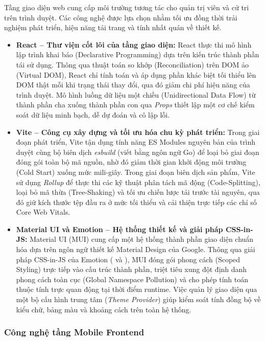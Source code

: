Tầng giao diện web cung cấp môi trường tương tác cho quản trị viên và cử tri trên trình duyệt. Các công nghệ được lựa chọn nhằm tối ưu đồng thời trải nghiệm phát triển, hiệu năng tải trang và tính nhất quán về thiết kế.

\begin{itemize}
    \item \textbf{React -- Thư viện cốt lõi của tầng giao diện:} React thực thi mô hình lập trình khai báo (Declarative Programming) dựa trên kiến trúc thành phần tái sử dụng. Thông qua thuật toán so khớp (Reconciliation) trên DOM ảo (Virtual DOM), React chỉ tính toán và áp dụng phần khác biệt tối thiểu lên DOM thật mỗi khi trạng thái thay đổi, qua đó giảm chi phí hiệu năng của trình duyệt. Mô hình luồng dữ liệu một chiều (Unidirectional Data Flow) từ thành phần cha xuống thành phần con qua \textit{Props} thiết lập một cơ chế kiểm soát dữ liệu minh bạch, dễ dự đoán và cô lập lỗi.

    \item \textbf{Vite -- Công cụ xây dựng và tối ưu hóa chu kỳ phát triển:} Trong giai đoạn phát triển, Vite tận dụng tính năng ES Modules nguyên bản của trình duyệt cùng bộ biên dịch \textit{esbuild} (viết bằng ngôn ngữ Go) để loại bỏ giai đoạn đóng gói toàn bộ mã nguồn, nhờ đó giảm thời gian khởi động môi trường (Cold Start) xuống mức mili-giây. Trong giai đoạn biên dịch sản phẩm, Vite sử dụng \textit{Rollup} để thực thi các kỹ thuật phân tách mã động (Code-Splitting), loại bỏ mã thừa (Tree-Shaking) và tối ưu chiến lược tải trước tài nguyên, qua đó giữ kích thước tệp đầu ra ở mức tối thiểu và cải thiện trực tiếp các chỉ số Core Web Vitals.

    \item \textbf{Material UI và Emotion -- Hệ thống thiết kế và giải pháp CSS-in-JS:} Material UI (MUI) cung cấp một hệ thống thành phần giao diện chuẩn hóa dựa trên ngôn ngữ thiết kế Material Design của Google. Thông qua giải pháp CSS-in-JS của Emotion ( và ), MUI đóng gói phong cách (Scoped Styling) trực tiếp vào cấu trúc thành phần, triệt tiêu xung đột định danh phong cách toàn cục (Global Namespace Pollution) và cho phép tính toán thuộc tính trực quan động tại thời điểm runtime. Việc quản lý giao diện qua một bộ cấu hình trung tâm (\textit{Theme Provider}) giúp kiểm soát tính đồng bộ về kiểu chữ, bảng màu và khoảng cách trên toàn hệ thống.
\end{itemize}

\subsubsection{Công nghệ tầng Mobile Frontend}

